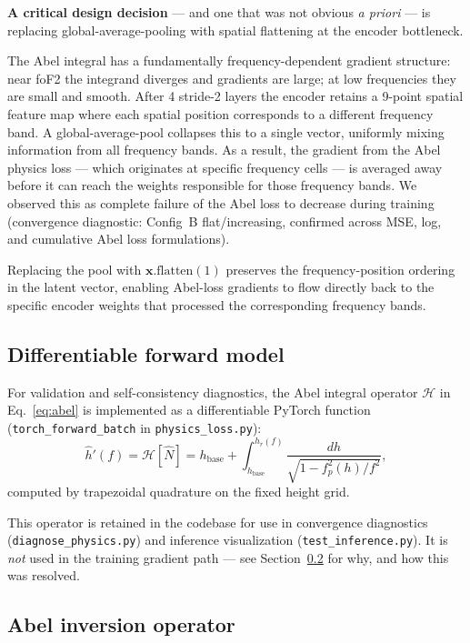 \documentclass[11pt,twocolumn]{article}
\begin{document}
\textbf{A critical design decision} — and one that was not obvious \emph{a
priori} — is replacing global-average-pooling with spatial flattening at the
encoder bottleneck.

The Abel integral has a fundamentally frequency-dependent gradient structure:
near foF2 the integrand diverges and gradients are large; at low frequencies
they are small and smooth.
After 4 stride-2 layers the encoder retains a 9-point spatial feature map
where each spatial position corresponds to a different frequency band.
A global-average-pool collapses this to a single vector, uniformly mixing
information from all frequency bands.
As a result, the gradient from the Abel physics loss --- which originates at
specific frequency cells --- is averaged away before it can reach the weights
responsible for those frequency bands.
We observed this as complete failure of the Abel loss to decrease during training
(convergence diagnostic: Config~B flat/increasing, confirmed across MSE, log, and
cumulative Abel loss formulations).

Replacing the pool with $\mathbf{x}.\text{flatten}(1)$ preserves the
frequency-position ordering in the latent vector, enabling Abel-loss gradients
to flow directly back to the specific encoder weights that processed the
corresponding frequency bands.

\subsection{Differentiable forward model}

For validation and self-consistency diagnostics, the Abel integral operator
$\mathcal{H}$ in Eq.~\eqref{eq:abel} is implemented as a differentiable
PyTorch function (\texttt{torch\_forward\_batch} in \texttt{physics\_loss.py}):
\begin{equation}
  \hat{h}'(f) = \mathcal{H}[\hat{N}] = h_\text{base} +
  \int_{h_\text{base}}^{h_r(f)}
  \frac{dh}{\sqrt{1 - f_p^2(h)/f^2}},
  \label{eq:forward}
\end{equation}
computed by trapezoidal quadrature on the fixed height grid.

This operator is retained in the codebase for use in convergence diagnostics
(\texttt{diagnose\_physics.py}) and inference visualization
(\texttt{test\_inference.py}).
It is \emph{not} used in the training gradient path — see Section~\ref{sec:inversion_loss}
for why, and how this was resolved.

\subsection{Abel inversion operator}
\label{sec:inversion_loss}
\end{document}
